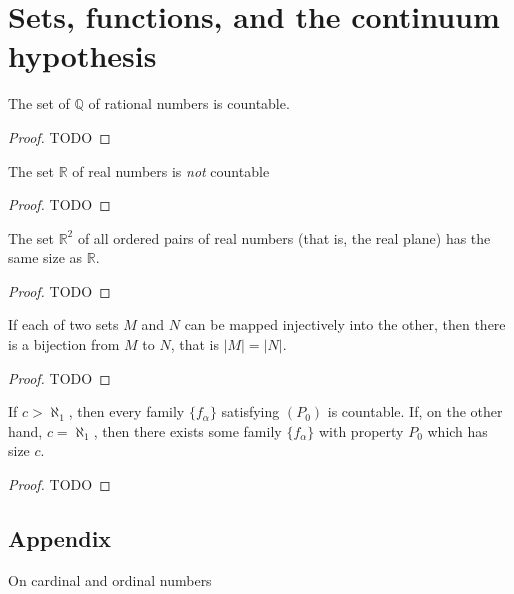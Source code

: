 \chapter{Sets, functions, and the continuum hypothesis}

\begin{theorem}
  \label{ch19theorem1}
  The set of \(\mathbb{Q}\) of rational numbers is countable.
\end{theorem}
\begin{proof}
  TODO
\end{proof}

\begin{theorem}
  \label{ch19theorem2}
  The set \(\mathbb{R}\) of real numbers is \emph{not} countable
\end{theorem}
\begin{proof}
  TODO
\end{proof}

\begin{theorem}
  \label{ch19theorem3}
  The set  \(\mathbb{R}^2\) of all ordered pairs of real numbers (that is, the
  real plane) has the same size as \(\mathbb{R}\).
\end{theorem}
\begin{proof}
  TODO
\end{proof}

\begin{theorem}
  \label{ch19theorem4}
  If each of two sets \(M\) and \(N\) can be mapped injectively into
  the other, then there is a bijection from \(M\) to \(N\), that is \(|M| = |N|\).
\end{theorem}
\begin{proof}
  TODO
\end{proof}

\begin{theorem}
  \label{ch19theorem5}
  If \(c > \aleph_1\), then every family \(\{f_\alpha\}\) satisfying \((P_0)\) is countable.
  If, on the other hand, \(c = \aleph_1\), then there exists some family \(\{f_\alpha\}\) with
  property \(P_0\) which has size \(c\).
\end{theorem}
\begin{proof}
  TODO
\end{proof}

\section*{Appendix} On cardinal and ordinal numbers

